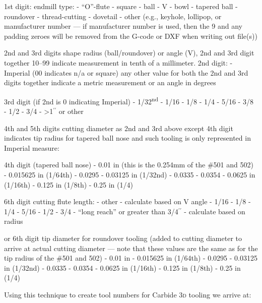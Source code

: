 \documentclass{ltxdoc}
\begin{document}
\begin{outline}
\1 1st digit: endmill type:
 - ``O''-flute 
 - square
 - ball
 - V
 - bowl
 - tapered ball
 - roundover
 - thread-cutting
 - dovetail
 - other (e.g., keyhole, lollipop, or manufacturer number --- if manufacturer number is used, then the 9 and any padding zeroes will be removed from the G-code or DXF when writing out file(s))

\1 2nd and 3rd digits shape radius (ball/roundover) or angle (V), 2nd and 3rd digit together 10--99 indicate measurement in tenth of a millimeter. 2nd digit:
 - Imperial (00 indicates n/a or square) 
\2 any other value for both the 2nd and 3rd digits together indicate a metric measurement or an angle in degrees

\1 3rd digit (if 2nd is 0 indicating Imperial)
 - 1/32\textsuperscript{nd}
 - 1/16
 - 1/8
 - 1/4
 - 5/16
 - 3/8
 - 1/2
 - 3/4
 - >1$^{\prime\prime}$ or other

\1 4th and 5th digits cutting diameter as 2nd and 3rd above except 4th digit indicates tip radius for tapered ball nose and such tooling is only represented in Imperial measure:

\1 4th digit (tapered ball nose)
 - 0.01 in (this is the 0.254mm of the \#501 and 502)
 - 0.015625 in (1/64th)
 - 0.0295
 - 0.03125 in (1/32nd)
 - 0.0335
 - 0.0354
 - 0.0625 in (1/16th)
 - 0.125 in (1/8th)
 - 0.25 in (1/4)

\1 6th digit cutting flute length:
 - other
 - calculate based on V angle
 - 1/16
 - 1/8
 - 1/4
 - 5/16
 - 1/2
  - 3/4
 - ``long reach'' or greater than 3/4$^{\prime\prime}$
 - calculate based on radius

\1 or 6th digit tip diameter for roundover tooling (added to cutting diameter to arrive at actual cutting diameter --- note that these values are the same as for the tip radius of the \#501 and 502)
 - 0.01 in 
 - 0.015625 in (1/64th)
 - 0.0295
 - 0.03125 in (1/32nd)
 - 0.0335
 - 0.0354
 - 0.0625 in (1/16th)
 - 0.125 in (1/8th)
 - 0.25 in (1/4)

\end{outline}

Using this technique to create tool numbers for Carbide \textsc{3d} tooling we arrive at:
\end{document}
